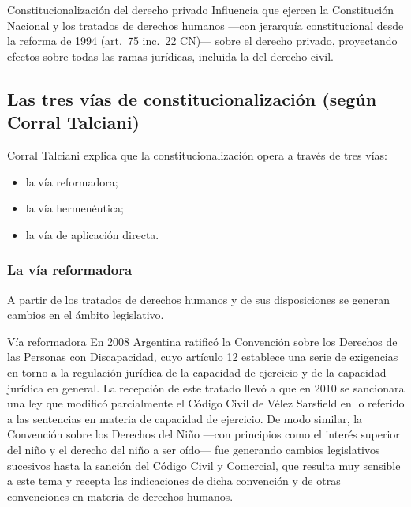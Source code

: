 \documentclass[12pt,oneside]{book}
\begin{document}
\begin{definition}{Constitucionalización del derecho privado}
Influencia que ejercen la Constitución Nacional y los tratados de derechos humanos —con jerarquía constitucional desde la reforma de 1994 (art.\ 75 inc.\ 22 CN)— sobre el derecho privado, proyectando efectos sobre todas las ramas jurídicas, incluida la del derecho civil.
\end{definition}

\subsection{Las tres vías de constitucionalización (según Corral Talciani)}

Corral Talciani explica que la constitucionalización opera a través de tres vías:

\begin{itemize}
    \item la vía reformadora;
    \item la vía hermenéutica;
    \item la vía de aplicación directa.
\end{itemize}

\subsubsection{La vía reformadora}

A partir de los tratados de derechos humanos y de sus disposiciones se generan cambios en el ámbito legislativo.

\begin{example}{Vía reformadora}
En 2008 Argentina ratificó la Convención sobre los Derechos de las Personas con Discapacidad, cuyo artículo 12 establece una serie de exigencias en torno a la regulación jurídica de la capacidad de ejercicio y de la capacidad jurídica en general. La recepción de este tratado llevó a que en 2010 se sancionara una ley que modificó parcialmente el Código Civil de Vélez Sarsfield en lo referido a las sentencias en materia de capacidad de ejercicio. De modo similar, la Convención sobre los Derechos del Niño —con principios como el interés superior del niño y el derecho del niño a ser oído— fue generando cambios legislativos sucesivos hasta la sanción del Código Civil y Comercial, que resulta muy sensible a este tema y recepta las indicaciones de dicha convención y de otras convenciones en materia de derechos humanos.
\end{example}
\end{document}
